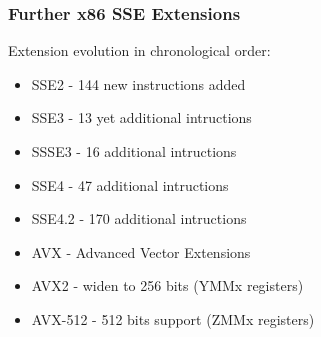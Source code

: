 \documentclass{beamer}
\begin{document}
\begin{frame}
\frametitle{Further x86 SSE Extensions}
Extension evolution in chronological order:
\begin{itemize}
\item SSE2 - 144 new instructions added
\item SSE3 - 13 yet additional intructions
\item SSSE3 - 16 additional intructions
\item SSE4 - 47 additional intructions
\item SSE4.2 - 170 additional intructions
\item AVX - Advanced Vector Extensions
\item AVX2 - widen to 256 bits (YMMx registers)
\item AVX-512 - 512 bits support (ZMMx registers)
\end{itemize}
\end{frame}
\end{document}
